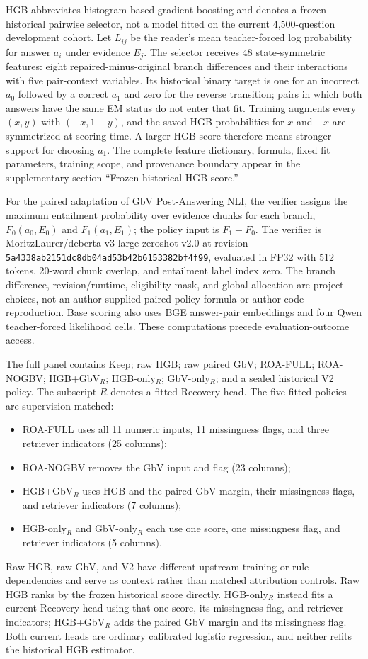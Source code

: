 \documentclass[11pt]{article}
\begin{document}
HGB abbreviates histogram-based gradient boosting and denotes a frozen historical pairwise selector, not a model fitted on the current 4,500-question development cohort. Let $L_{ij}$ be the reader's mean teacher-forced log probability for answer $a_i$ under evidence $E_j$. The selector receives 48 state-symmetric features: eight repaired-minus-original branch differences and their interactions with five pair-context variables. Its historical binary target is one for an incorrect $a_0$ followed by a correct $a_1$ and zero for the reverse transition; pairs in which both answers have the same EM status do not enter that fit. Training augments every $(x,y)$ with $(-x,1-y)$, and the saved HGB probabilities for $x$ and $-x$ are symmetrized at scoring time. A larger HGB score therefore means stronger support for choosing $a_1$. The complete feature dictionary, formula, fixed fit parameters, training scope, and provenance boundary appear in the supplementary section ``Frozen historical HGB score.''

For the paired adaptation of GbV Post-Answering NLI, the verifier assigns the maximum entailment probability over evidence chunks for each branch, $F_0(a_0,E_0)$ and $F_1(a_1,E_1)$; the policy input is $F_1-F_0$. The verifier is MoritzLaurer/deberta-v3-large-zeroshot-v2.0 at revision \nolinkurl{5a4338ab2151dc8db04ad53b42b6153382bf4f99}, evaluated in FP32 with 512 tokens, 20-word chunk overlap, and entailment label index zero. The branch difference, revision/runtime, eligibility mask, and global allocation are project choices, not an author-supplied paired-policy formula or author-code reproduction. Base scoring also uses BGE answer-pair embeddings and four Qwen teacher-forced likelihood cells. These computations precede evaluation-outcome access.

The full panel contains Keep; raw HGB; raw paired GbV; ROA-FULL; ROA-NOGBV; HGB+\allowbreak GbV$_R$; HGB-\allowbreak only$_R$; GbV-\allowbreak only$_R$; and a sealed historical V2 policy. The subscript $R$ denotes a fitted Recovery head. The five fitted policies are supervision matched:
\begin{itemize}
  \item ROA-FULL uses all 11 numeric inputs, 11 missingness flags, and three retriever indicators (25 columns);
  \item ROA-NOGBV removes the GbV input and flag (23 columns);
  \item HGB+GbV$_R$ uses HGB and the paired GbV margin, their missingness flags, and retriever indicators (7 columns);
  \item HGB-only$_R$ and GbV-only$_R$ each use one score, one missingness flag, and retriever indicators (5 columns).
\end{itemize}
Raw HGB, raw GbV, and V2 have different upstream training or rule dependencies and serve as context rather than matched attribution controls. Raw HGB ranks by the frozen historical score directly. HGB-only$_R$ instead fits a current Recovery head using that one score, its missingness flag, and retriever indicators; HGB+GbV$_R$ adds the paired GbV margin and its missingness flag. Both current heads are ordinary calibrated logistic regression, and neither refits the historical HGB estimator.
\end{document}
